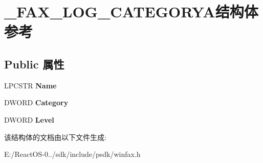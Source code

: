 \hypertarget{struct___f_a_x___l_o_g___c_a_t_e_g_o_r_y_a}{}\section{\+\_\+\+F\+A\+X\+\_\+\+L\+O\+G\+\_\+\+C\+A\+T\+E\+G\+O\+R\+Y\+A结构体 参考}
\label{struct___f_a_x___l_o_g___c_a_t_e_g_o_r_y_a}
\subsection*{Public 属性}
\begin{DoxyCompactItemize}
\item 
\mbox{\label{struct___f_a_x___l_o_g___c_a_t_e_g_o_r_y_a_afab33f184d2f0a5b32483fb0a6837f43}} 
L\+P\+C\+S\+TR {\bfseries Name}
\item 
\mbox{\label{struct___f_a_x___l_o_g___c_a_t_e_g_o_r_y_a_ad50e25a28244abc388c4f115509b3c1d}} 
D\+W\+O\+RD {\bfseries Category}
\item 
\mbox{\label{struct___f_a_x___l_o_g___c_a_t_e_g_o_r_y_a_a115d6f19c0087ca7298b68466b1d33cb}} 
D\+W\+O\+RD {\bfseries Level}
\end{DoxyCompactItemize}


该结构体的文档由以下文件生成\+:\begin{DoxyCompactItemize}
\item 
E\+:/\+React\+O\+S-\/0../sdk/include/psdk/winfax.\+h\end{DoxyCompactItemize}
